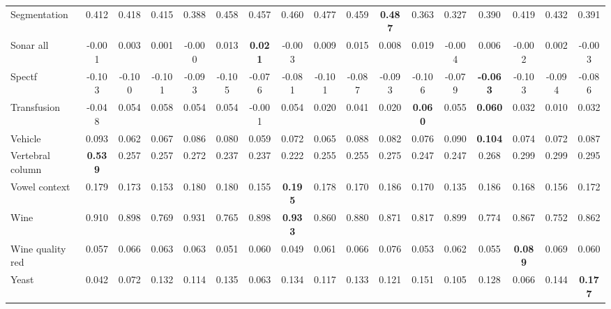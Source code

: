 \begin{tabular}{lcccccccccccccccc}
Segmentation & 0.412 & 0.418 & 0.415 & 0.388 & 0.458 & 0.457 & 0.460 & 0.477 & 0.459 & \textbf{0.487} & 0.363 & 0.327 & 0.390 & 0.419 & 0.432 & 0.391 \\
Sonar all & -0.001 & 0.003 & 0.001 & -0.000 & 0.013 & \textbf{0.021} & -0.003 & 0.009 & 0.015 & 0.008 & 0.019 & -0.004 & 0.006 & -0.002 & 0.002 & -0.003 \\
Spectf & -0.103 & -0.100 & -0.101 & -0.093 & -0.105 & -0.076 & -0.081 & -0.101 & -0.087 & -0.093 & -0.106 & -0.079 & \textbf{-0.063} & -0.103 & -0.094 & -0.086 \\
Transfusion & -0.048 & 0.054 & 0.058 & 0.054 & 0.054 & -0.001 & 0.054 & 0.020 & 0.041 & 0.020 & \textbf{0.060} & 0.055 & \textbf{0.060} & 0.032 & 0.010 & 0.032 \\
Vehicle & 0.093 & 0.062 & 0.067 & 0.086 & 0.080 & 0.059 & 0.072 & 0.065 & 0.088 & 0.082 & 0.076 & 0.090 & \textbf{0.104} & 0.074 & 0.072 & 0.087 \\
Vertebral column & \textbf{0.539} & 0.257 & 0.257 & 0.272 & 0.237 & 0.237 & 0.222 & 0.255 & 0.255 & 0.275 & 0.247 & 0.247 & 0.268 & 0.299 & 0.299 & 0.295 \\
Vowel context & 0.179 & 0.173 & 0.153 & 0.180 & 0.180 & 0.155 & \textbf{0.195} & 0.178 & 0.170 & 0.186 & 0.170 & 0.135 & 0.186 & 0.168 & 0.156 & 0.172 \\
Wine & 0.910 & 0.898 & 0.769 & 0.931 & 0.765 & 0.898 & \textbf{0.933} & 0.860 & 0.880 & 0.871 & 0.817 & 0.899 & 0.774 & 0.867 & 0.752 & 0.862 \\
Wine quality red & 0.057 & 0.066 & 0.063 & 0.063 & 0.051 & 0.060 & 0.049 & 0.061 & 0.066 & 0.076 & 0.053 & 0.062 & 0.055 & \textbf{0.089} & 0.069 & 0.060 \\
Yeast & 0.042 & 0.072 & 0.132 & 0.114 & 0.135 & 0.063 & 0.134 & 0.117 & 0.133 & 0.121 & 0.151 & 0.105 & 0.128 & 0.066 & 0.144 & \textbf{0.177} \\
\bottomrule\end{tabular}

